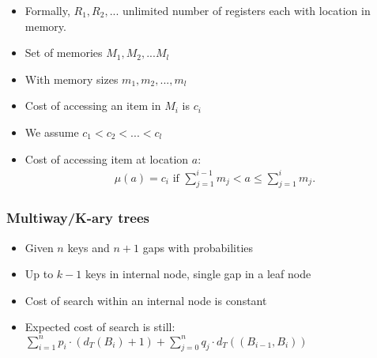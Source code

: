 \documentclass{beamer}
\theoremstyle{plain}
\begin{document}
\begin{frame}
\begin{itemize}
\item Formally, $R_1, R_2, ...$ unlimited number of registers each with location in memory.
\item Set of memories $M_1, M_2, ...M_l$
\item With memory sizes $m_1, m_2, ..., m_l$
\item Cost of accessing an item in $M_i$ is $c_i$
\item We assume $c_1 < c_2 < ... < c_l$
\item Cost of accessing item at location $a$:
\begin{align*}
\mu (a) = c_i \text{ if } \sum_{j = 1}^{i-1}m_j  < a \leq \sum_{j = 1}^{i}m_j.
\end{align*}
\end{itemize}
\end{frame}

\begin{frame} \frametitle{Multiway/K-ary trees} \label{sec:MWT}
\begin{tiny}
\begin{center}


\end{center}
\end{tiny}

\begin{itemize}

\item Given $n$ keys and $n+1$ gaps with probabilities

\item Up to $k-1$ keys in internal node, single gap in a leaf node

\item Cost of search within an internal node is constant

\item Expected cost of search is still: \\
$\sum_{i=1}^{n} p_i \cdot (d_T(B_i)+1) + \sum_{j=0}^{n} q_j \cdot d_T((B_{i-1},B_i))$


\end{itemize}

\end{frame}
\end{document}
